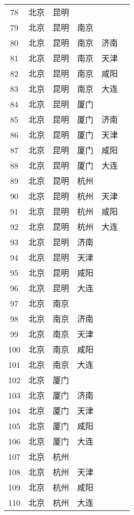\begin{footnotesize}
\begin{longtable}{cccccc}
        78	& 北京  & 昆明 \\
        79	& 北京  & 昆明  & 南京 \\
        80	& 北京  & 昆明  & 南京  & 济南 \\
        81	& 北京  & 昆明  & 南京  & 天津 \\
        82	& 北京  & 昆明  & 南京  & 咸阳 \\
        83	& 北京  & 昆明  & 南京  & 大连 \\
        84	& 北京  & 昆明  & 厦门 \\
        85	& 北京  & 昆明  & 厦门  & 济南 \\
        86	& 北京  & 昆明  & 厦门  & 天津 \\
        87	& 北京  & 昆明  & 厦门  & 咸阳 \\
        88	& 北京  & 昆明  & 厦门  & 大连 \\
        89	& 北京  & 昆明  & 杭州 \\
        90	& 北京  & 昆明  & 杭州  & 天津 \\
        91	& 北京  & 昆明  & 杭州  & 咸阳 \\
        92	& 北京  & 昆明  & 杭州  & 大连 \\
        93	& 北京  & 昆明  & 济南 \\
        94	& 北京  & 昆明  & 天津 \\
        95	& 北京  & 昆明  & 咸阳 \\
        96	& 北京  & 昆明  & 大连 \\
        97	& 北京  & 南京 \\
        98	& 北京  & 南京  & 济南 \\
        99	& 北京  & 南京  & 天津 \\
        100	& 北京  & 南京  & 咸阳 \\
        101	& 北京  & 南京  & 大连 \\
        102	& 北京  & 厦门 \\
        103	& 北京  & 厦门  & 济南 \\
        104	& 北京  & 厦门  & 天津 \\
        105	& 北京  & 厦门  & 咸阳 \\
        106	& 北京  & 厦门  & 大连 \\
        107	& 北京  & 杭州 \\
        108	& 北京  & 杭州  & 天津 \\
        109	& 北京  & 杭州  & 咸阳 \\
        110	& 北京  & 杭州  & 大连 \\

\end{longtable}
\end{footnotesize}
